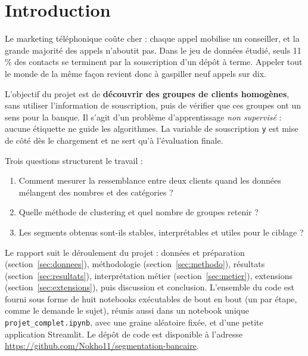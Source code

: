 \documentclass[11pt,a4paper]{article}
\begin{document}
\vspace{0.2cm}
\setcounter{tocdepth}{1}
{\small\tableofcontents}
\newpage

\section{Introduction}

Le marketing téléphonique coûte cher : chaque appel mobilise un conseiller, et la grande majorité des appels n'aboutit pas. Dans le jeu de données étudié, seuls 11\,\% des contacts se terminent par la souscription d'un dépôt à terme. Appeler tout le monde de la même façon revient donc à gaspiller neuf appels sur dix.

L'objectif du projet est de \textbf{découvrir des groupes de clients homogènes}, sans utiliser l'information de souscription, puis de vérifier que ces groupes ont un sens pour la banque. Il s'agit d'un problème d'apprentissage \emph{non supervisé} : aucune étiquette ne guide les algorithmes. La variable de souscription \texttt{y} est mise de côté dès le chargement et ne sert qu'à l'évaluation finale.

Trois questions structurent le travail :
\begin{enumerate}
\item Comment mesurer la ressemblance entre deux clients quand les données mélangent des nombres et des catégories ?
\item Quelle méthode de clustering et quel nombre de groupes retenir ?
\item Les segments obtenus sont-ils stables, interprétables et utiles pour le ciblage ?
\end{enumerate}

Le rapport suit le déroulement du projet : données et préparation (section~\ref{sec:donnees}), méthodologie (section~\ref{sec:methodo}), résultats (section~\ref{sec:resultats}), interprétation métier (section~\ref{sec:metier}), extensions (section~\ref{sec:extensions}), puis discussion et conclusion. L'ensemble du code est fourni sous forme de huit notebooks exécutables de bout en bout (un par étape, comme le demande le sujet), réunis aussi dans un notebook unique \texttt{projet\_complet.ipynb}, avec une graine aléatoire fixée, et d'une petite application Streamlit. Le dépôt de code est disponible à l'adresse \url{https://github.com/Nokho11/segmentation-bancaire}.

\end{document}
